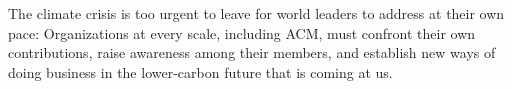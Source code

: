 \documentclass[12pt]{article}
\newcommand{\bcp}[1]{\ifdraft{\bf [bcp: #1]}\fi}
\newcommand{\mwh}[1]{\ifdraft{\bf [mwh: #1]}\fi}
\newcommand{\SECTION}{\section*}
\begin{document}
The climate crisis is too urgent to leave for world leaders to address at
their own pace: Organizations at every scale, including ACM, must confront
their own contributions, raise awareness among their members, and establish
new ways of doing business in the lower-carbon future that is coming at us.









\end{document}
